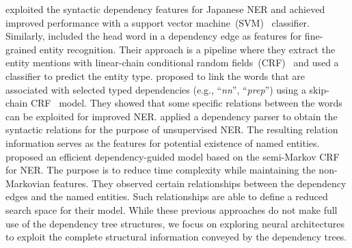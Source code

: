 \citet{sasano2008japanese} exploited the syntactic dependency features for Japanese NER and achieved improved performance with a support vector machine~(SVM)~\cite{cortes1995support} classifier. 
Similarly, \citet{ling2012fine} included the head word in a dependency edge as features for fine-grained entity recognition. 
Their approach is a pipeline where they extract the entity mentions with  linear-chain conditional random fields~(CRF)~\cite{lafferty2001conditional} and used a classifier to predict the entity type.
\citet{liu2010recognizing} proposed to link the words that are associated with selected typed dependencies (e.g., ``{\it nn}'', ``{\it prep}'') using a skip-chain CRF~\cite{sutton2004collective} model. 
They showed that some specific relations between the words can be exploited for improved NER. 
\citet{cucchiarelli2001unsupervised} applied a dependency parser to obtain the syntactic relations for the purpose of unsupervised NER. 
The resulting relation information serves as the features for potential existence of named entities. 
\citet{jie2017efficient} proposed an efficient dependency-guided model based on the semi-Markov CRF~\cite{sarawagi2004semi} for NER. 
The purpose is to reduce time complexity while maintaining the non-Markovian features.
They observed certain relationships between the dependency edges and the named entities. 
Such relationships are able to define a reduced search space for their model. 
While these previous approaches do not make full use of the dependency tree structures, we focus on exploring neural architectures to exploit the  complete structural information conveyed by the dependency trees.



